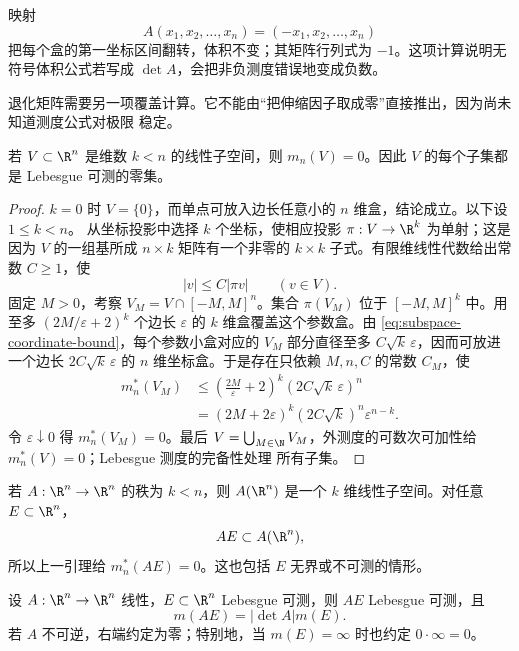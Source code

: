 \begin{example}[反射]\label{ex:2-4-2-2}
映射
\[
 A(x_1,x_2,\dots,x_n)=(-x_1,x_2,\dots,x_n)
\]
把每个盒的第一坐标区间翻转，体积不变；其矩阵行列式为 $-1$。这项计算说明无符号体积公式若写成
$\det A$，会把非负测度错误地变成负数。
\end{example}

退化矩阵需要另一项覆盖计算。它不能由“把伸缩因子取成零”直接推出，因为尚未知道测度公式对极限
稳定。

\begin{lemma}[低维线性子空间零测]\label{lemma:2-4-2-lower-dimensional-null}
若 $V\subset\R^n$ 是维数 $k<n$ 的线性子空间，则 $m_n(V)=0$。因此 $V$ 的每个子集都是
Lebesgue 可测的零集。
\end{lemma}

\begin{proof}
\(k=0\) 时 \(V=\{0\}\)，而单点可放入边长任意小的 \(n\) 维盒，结论成立。以下设
\(1\le k<n\)。
从坐标投影中选择 $k$ 个坐标，使相应投影 $\pi:V\to\R^k$ 为单射；这是因为 $V$ 的一组基所成
$n\times k$ 矩阵有一个非零的 $k\times k$ 子式。有限维线性代数给出常数 $C\ge1$，使
\[
 |v|\le C|\pi v|\qquad(v\in V).
 \tag{2.4.13}\label{eq:subspace-coordinate-bound}
\]
固定 $M>0$，考察 $V_M=V\cap[-M,M]^n$。集合 $\pi(V_M)$ 位于 $[-M,M]^k$ 中。用至多
$(2M/\varepsilon+2)^k$ 个边长 $\varepsilon$ 的 $k$ 维盒覆盖这个参数盒。由
\eqref{eq:subspace-coordinate-bound}，每个参数小盒对应的 $V_M$ 部分直径至多
$C\sqrt{k}\,\varepsilon$，因而可放进一个边长
$2C\sqrt{k}\,\varepsilon$ 的 $n$ 维坐标盒。于是存在只依赖 $M,n,C$ 的常数 $C_M$，使
\[
\begin{aligned}
 m_n^*(V_M)
 &\le\left(\frac{2M}{\varepsilon}+2\right)^k
       (2C\sqrt{k}\,\varepsilon)^n\\
 &=(2M+2\varepsilon)^k(2C\sqrt{k})^n
       \varepsilon^{n-k}.
\end{aligned}
\]
令 $\varepsilon\downarrow0$ 得 $m_n^*(V_M)=0$。最后
$V=\bigcup_{M\in\N}V_M$，外测度的可数次可加性给 $m_n^*(V)=0$；Lebesgue 测度的完备性处理
所有子集。
\end{proof}

\begin{example}[奇异映射]\label{ex:2-4-2-3}
若 $A:\R^n\to\R^n$ 的秩为 $k<n$，则 $A(\R^n)$ 是一个 $k$ 维线性子空间。对任意
$E\subset\R^n$，
\[
 AE\subset A(\R^n),
\]
所以上一引理给 $m_n^*(AE)=0$。这也包括 $E$ 无界或不可测的情形。
\end{example}

\begin{theorem}[线性换元的集合公式]\label{theorem:2-4-2-2}
设 $A:\R^n\to\R^n$ 线性，$E\subset\R^n$ Lebesgue 可测，则 $AE$ Lebesgue 可测，且
\[
 m(AE)=|\det A|m(E).
 \tag{2.4.14}\label{eq:linear-change-set}
\]
若 $A$ 不可逆，右端约定为零；特别地，当 $m(E)=\infty$ 时也约定
$0\cdot\infty=0$。
\end{theorem}

